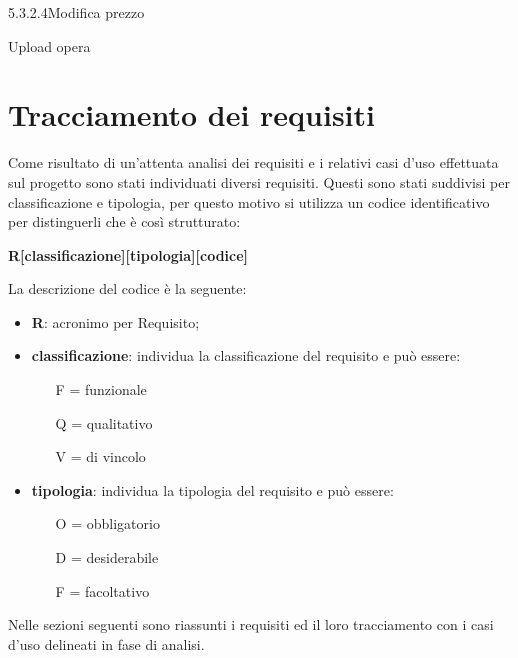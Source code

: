 \begin{usecase}{5.3.2.4}{Modifica prezzo}
	\usecasepre{}
	\usecasedesc{}
	\usecasepost{}
\end{usecase}

\begin{usecase}{5.4}{Upload opera}
	\usecasepre{}
	\usecasedesc{}
	\usecasepost{}
\end{usecase}

\section{Tracciamento dei requisiti}

Come risultato di un'attenta analisi dei requisiti e i relativi casi d'uso effettuata sul progetto sono stati individuati diversi requisiti. Questi sono stati suddivisi per classificazione e tipologia, per questo motivo si utilizza un codice identificativo per distinguerli che è così strutturato:
\begin{center}
	\textbf{R[classificazione][tipologia][codice]}
\end{center}
La descrizione del codice è la seguente:
\begin{itemize}
	\item \textbf{R}: acronimo per Requisito;
	\item \textbf{classificazione}: individua la classificazione del requisito e può essere:
	\begin{itemize}
		\item [F =] funzionale
		\item [Q =] qualitativo
		\item [V =]  di vincolo
	\end{itemize}
	\item \textbf{tipologia}: individua la tipologia del requisito e può essere:
	\begin{itemize}
		\item [O =] obbligatorio
		\item [D =] desiderabile
		\item [F =] facoltativo
	\end{itemize}
\end{itemize}

Nelle sezioni seguenti sono riassunti i requisiti ed il loro tracciamento con i casi d'uso delineati in fase di analisi.

